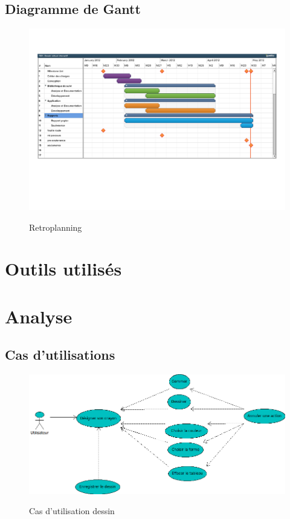 \documentclass{report}
\begin{document}
			\subsection{Diagramme de Gantt}
				\begin{figure}[!h]
						\centering
						\includegraphics[scale=0.6]{../soutenance/retro-planning.pdf}\\
						\caption{Retroplanning}
						\label{Retroplanning}
				\end{figure}
		\newpage
		\section{Outils utilisés}

		\newpage
		\section{Analyse}
			\subsection{Cas d'utilisations}
				\begin{figure}[!h]
						\centering
						\includegraphics[scale=0.6]{../uml/Dessin.png}\\
						\caption{Cas d'utilisation dessin}
						\label{Cas d'utilisation}
				\end{figure}
			\newpage
\end{document}
